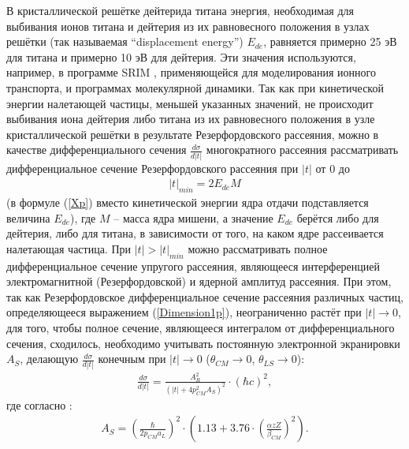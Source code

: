 \documentclass[a4paper,12pt]{article}
\begin{document}
\begin{large}
  В кристаллической решётке дейтерида титана энергия, необходимая для выбивания ионов титана и дейтерия из их равновесного положения в узлах решётки (так называемая ``displacement energy'') $E_{de}$, равняется примерно 25 эВ для титана и примерно 10 эВ для дейтерия.
  Эти значения используются, например, в программе SRIM \cite{SRIM}, применяющейся для моделирования ионного транспорта, и программах молекулярной динамики.
  Так как при кинетической энергии налетающей частицы, меньшей указанных значений, не происходит выбивания иона дейтерия либо титана из их равновесного положения в узле кристаллической решётки в результате Резерфордовского рассеяния, можно в качестве дифференциального сечения $\frac{d\sigma}{d|t|}$ многократного рассеяния рассматривать дифференциальное сечение Резерфордовского рассеяния при $|t|$ от 0 до
\begin{equation}
\begin{aligned} 
 \label{MSTmin}  
    |t|_{min}=2E_{de}M
\end{aligned}
\end{equation}
(в формуле (\ref{Xp}) вместо кинетической энергии ядра отдачи подставляется величина $E_{de}$), где $M$ -- масса ядра мишени, а значение $E_{de}$ берётся либо для дейтерия, либо для титана, в зависимости от того, на каком ядре рассеивается налетающая частица.
  При $|t|>|t|_{min}$ можно рассматривать полное дифференциальное сечение упругого рассеяния, являющееся интерференцией электромагнитной (Резерфордовской) и ядерной амплитуд рассеяния.
  При этом, так как Резерфордовское дифференциальное сечение рассеяния различных частиц, определяющееся выражением (\ref{Dimension1p}), неограниченно растёт при $|t| \to 0$, для того, чтобы полное сечение, являющееся интегралом от дифференциального сечения, сходилось, необходимо учитывать постоянную электронной экранировки $A_S$, делающую $\frac{d\sigma}{d|t|}$ конечным при $|t| \to 0$ ($\theta_{CM} \to 0$, $\theta_{LS} \to 0$):
\begin{equation}
 \begin{aligned} 
 \label{MS1}     
      \frac{d\sigma}{d|t|}=  
      \frac{A_R^2}{\left( |t| + 4 p_{CM}^2 A_S \right)^2} \cdot \left( \hbar c \right)^2,
 \end{aligned}
\end{equation}
где согласно \cite{G4IonIon}:
\begin{equation}
\label{MSAs}
\begin{aligned} 
A_S= \left( \frac{ \hbar }{ 2 p_{CM} a_L } \right)^2 \cdot \left( 1.13 + 3.76 \cdot \left( \frac{ \alpha z Z}{\beta_{CM}} \right)^2 \right).
\end{aligned}
\end{equation}


\end{large}
\end{document}
